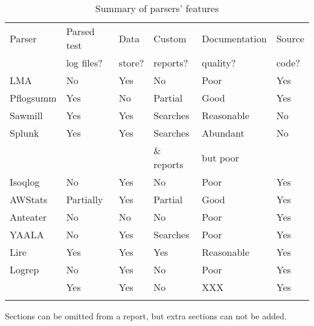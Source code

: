 \begin{table}[htb]
    \caption{Summary of parsers' features}
    \empty{}\label{Summary of parsers' features}
    \begin{tabular}{llllll}
        Parser          & Parsed test   & Data              & Custom            & Documentation  & Source \\
                        & log files?    & store?            & reports?          & quality?       & code?  \\
        \tableline{}%
        \gls{LMA}          & No            & Yes               & No                & Poor           & Yes    \\ 
        Pflogsumm       & Yes           & No                & Partial \dag{}    & Good           & Yes    \\
        Sawmill         & Yes           & Yes               & Searches          & Reasonable     & No     \\
        Splunk          & Yes           & Yes               & Searches          & Abundant       & No     \\
                        &               &                   & \& reports        & but poor       &        \\
        Isoqlog         & No            & Yes               & No                & Poor           & Yes    \\
        AWStats         & Partially     & Yes               & Partial \dag{}    & Good           & Yes    \\
        Anteater        & No            & No                & No                & Poor           & Yes    \\
        YAALA           & No            & Yes \ddag{}       & Searches          & Poor           & Yes    \\
        Lire            & Yes           & Yes               & Yes               & Reasonable     & Yes    \\
        Logrep          & No            & Yes               & No                & Poor           & Yes    \\
        \parsername{}   & Yes           & Yes \nialpha{}    & No \nibeta{}      & XXX            & Yes    \\
        \tableline{}
    \end{tabular}

    \begin{eqlist}

        \item [\dag{}] Sections can be omitted from a report, but extra
            sections can not be added.


\end{eqlist}
\end{table}
